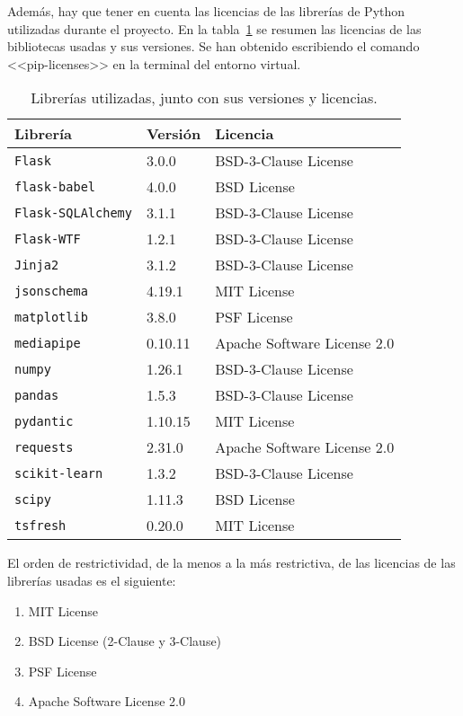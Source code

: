 Además, hay que tener en cuenta las licencias de las librerías de Python utilizadas durante el proyecto. En la tabla~\ref{a:licencias} se resumen las licencias de las bibliotecas usadas y sus versiones. Se han obtenido escribiendo el comando <<pip-licenses>> en la terminal del entorno virtual.

\begin{table}[p]
    \begin{tabularx}{\linewidth}{ p{} p{} p{} }
        \toprule
        \textbf{Librería} & \hfil\textbf{Versión} & \textbf{Licencia} \\
        \midrule
        \texttt{Flask} & \hfil3.0.0 & BSD-3-Clause License \\
        \texttt{flask-babel} & \hfil4.0.0 & BSD License \\
        \texttt{Flask-SQLAlchemy} & \hfil3.1.1 & BSD-3-Clause License \\
        \texttt{Flask-WTF} & \hfil1.2.1 & BSD-3-Clause License \\
        \texttt{Jinja2} & \hfil3.1.2 & BSD-3-Clause License \\
        \texttt{jsonschema} & \hfil4.19.1 & MIT License \\
        \texttt{matplotlib} & \hfil3.8.0 & PSF License \\
        \texttt{mediapipe} & \hfil0.10.11 & Apache Software License 2.0 \\
        \texttt{numpy} & \hfil1.26.1 & BSD-3-Clause License \\
        \texttt{pandas} & \hfil1.5.3 & BSD-3-Clause License \\
        \texttt{pydantic} & \hfil1.10.15 & MIT License \\
        \texttt{requests} & \hfil2.31.0 & Apache Software License 2.0 \\
        \texttt{scikit-learn} & \hfil1.3.2 & BSD-3-Clause License \\
        \texttt{scipy} & \hfil1.11.3 & BSD License \\
        \texttt{tsfresh} & \hfil0.20.0 & MIT License \\
        \bottomrule
    \end{tabularx}
    \caption[Licencias]{Librerías utilizadas, junto con sus versiones y licencias.}
    \label{a:licencias}
\end{table}

El orden de restrictividad, de la menos a la más restrictiva, de las licencias de las librerías usadas es el siguiente:
\begin{enumerate}
    \item MIT License
    \item BSD License (2-Clause y 3-Clause)
    \item PSF License
    \item Apache Software License 2.0
\end{enumerate}

